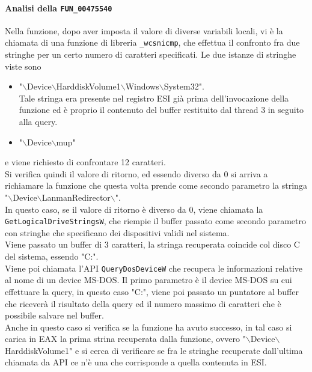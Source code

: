 \documentclass[12pt]{extarticle}
\begin{document}
\paragraph{Analisi della \texttt{FUN\_00475540}} Nella funzione, dopo aver imposta il valore di diverse variabili locali, vi è la chiamata di una funzione di libreria \texttt{\_wcsnicmp}, che effettua il confronto fra due stringhe per un certo numero di caratteri specificati. Le due istanze di stringhe viste sono
\begin{itemize}
    \item "$\backslash$Device$\backslash$HarddiskVolume1$\backslash$Windows$\backslash$System32".\\Tale stringa era presente nel registro ESI già prima dell'invocazione della funzione ed è proprio il contenuto del buffer restituito dal thread 3 in seguito alla query.
    \item "$\backslash$Device$\backslash$mup" 
\end{itemize}
 e viene richiesto di confrontare 12 caratteri.\\Si verifica quindi il valore di ritorno, ed essendo diverso da 0 si arriva a richiamare la funzione che questa volta prende come secondo parametro la stringa "$\backslash$Device$\backslash$LanmanRedirector$\backslash$".\\In questo caso, se il valore di ritorno è diverso da 0, viene chiamata la \texttt{GetLogicalDriveStringsW}, che riempie il buffer passato come secondo parametro con stringhe che specificano dei dispositivi validi nel sistema.\\Viene passato un buffer di 3 caratteri, la stringa recuperata coincide col disco C del sistema, essendo "C:".\\Viene poi chiamata l'API \texttt{QueryDosDeviceW} che recupera le informazioni relative al nome di un device MS-DOS. Il primo parametro è il device MS-DOS su cui effettuare la query, in questo caso "C:", viene poi passato un puntatore al buffer che riceverà il risultato della query ed il numero massimo di caratteri che è possibile salvare nel buffer.\\Anche in questo caso si verifica se la funzione ha avuto successo, in tal caso si carica in EAX la prima strina recuperata dalla funzione, ovvero "$\backslash$Device$\backslash$HarddiskVolume1" e si cerca di verificare se fra le stringhe recuperate dall'ultima chiamata da API ce n'è una che corrisponde a quella contenuta in ESI.
\end{document}
